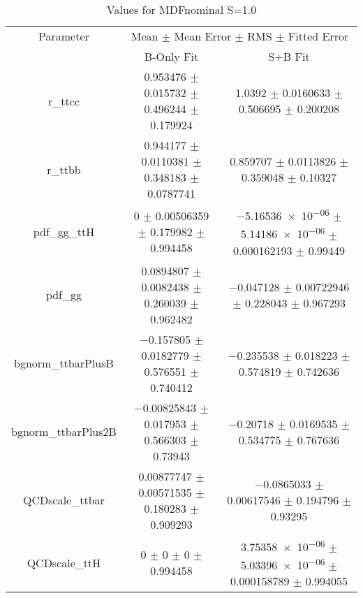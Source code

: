 \begin{table}
\centering
\caption{Values for MDFnominal S=1.0}
\begin{tabular}{ccc}
\toprule
Parameter & \multicolumn{2}{c}{Mean $\pm$ Mean Error $\pm$ RMS $\pm$ Fitted Error}\\
 & B-Only Fit & S+B Fit\\
\midrule
r\_ttcc & \num{0.953476} $\pm$ \num{0.015732} $\pm$ \num{0.496244} $\pm$ \num{0.179924} & \num{1.0392} $\pm$ \num{0.0160633} $\pm$ \num{0.506695} $\pm$ \num{0.200208}\\
r\_ttbb & \num{0.944177} $\pm$ \num{0.0110381} $\pm$ \num{0.348183} $\pm$ \num{0.0787741} & \num{0.859707} $\pm$ \num{0.0113826} $\pm$ \num{0.359048} $\pm$ \num{0.10327}\\
pdf\_gg\_ttH & \num{0} $\pm$ \num{0.00506359} $\pm$ \num{0.179982} $\pm$ \num{0.994458} & \num{-5.16536e-06} $\pm$ \num{5.14186e-06} $\pm$ \num{0.000162193} $\pm$ \num{0.99449}\\
pdf\_gg & \num{0.0894807} $\pm$ \num{0.0082438} $\pm$ \num{0.260039} $\pm$ \num{0.962482} & \num{-0.047128} $\pm$ \num{0.00722946} $\pm$ \num{0.228043} $\pm$ \num{0.967293}\\
bgnorm\_ttbarPlusB & \num{-0.157805} $\pm$ \num{0.0182779} $\pm$ \num{0.576551} $\pm$ \num{0.740412} & \num{-0.235538} $\pm$ \num{0.018223} $\pm$ \num{0.574819} $\pm$ \num{0.742636}\\
bgnorm\_ttbarPlus2B & \num{-0.00825843} $\pm$ \num{0.017953} $\pm$ \num{0.566303} $\pm$ \num{0.73943} & \num{-0.20718} $\pm$ \num{0.0169535} $\pm$ \num{0.534775} $\pm$ \num{0.767636}\\
QCDscale\_ttbar & \num{0.00877747} $\pm$ \num{0.00571535} $\pm$ \num{0.180283} $\pm$ \num{0.909293} & \num{-0.0865033} $\pm$ \num{0.00617546} $\pm$ \num{0.194796} $\pm$ \num{0.93295}\\
QCDscale\_ttH & \num{0} $\pm$ \num{0} $\pm$ \num{0} $\pm$ \num{0.994458} & \num{3.75358e-06} $\pm$ \num{5.03396e-06} $\pm$ \num{0.000158789} $\pm$ \num{0.994055}\\
\bottomrule
\end{tabular}
\end{table}